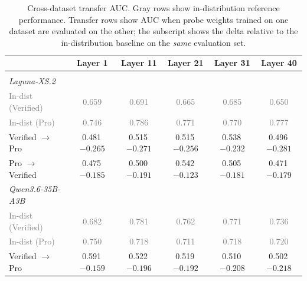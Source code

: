 \begin{table}[t]
\centering
\caption{Cross-dataset transfer AUC. Gray rows show in-distribution reference performance. Transfer rows show AUC when probe weights trained on one dataset are evaluated on the other; the subscript shows the delta relative to the in-distribution baseline on the \emph{same} evaluation set.}
\label{tab:transfer}
\begin{tabular}{lccccc}
\toprule
 & Layer 1 & Layer 11 & Layer 21 & Layer 31 & Layer 40 \\
\midrule
\multicolumn{6}{l}{\textit{\Syntactic{}}} \\
\quad{}\textit{Laguna-XS.2} \\
\qquad{}\textcolor{gray}{\small In-dist (Verified)} & \textcolor{gray}{\small 0.659} & \textcolor{gray}{\small 0.691} & \textcolor{gray}{\small 0.665} & \textcolor{gray}{\small 0.685} & \textcolor{gray}{\small 0.650} \\
\qquad{}\textcolor{gray}{\small In-dist (Pro)} & \textcolor{gray}{\small 0.746} & \textcolor{gray}{\small 0.786} & \textcolor{gray}{\small 0.771} & \textcolor{gray}{\small 0.770} & \textcolor{gray}{\small 0.777} \\
\qquad{}Verified $\rightarrow$ Pro & 0.481\,{\scriptsize \textcolor{red!70!black}{$-0.265$}} & 0.515\,{\scriptsize \textcolor{red!70!black}{$-0.271$}} & 0.515\,{\scriptsize \textcolor{red!70!black}{$-0.256$}} & 0.538\,{\scriptsize \textcolor{red!70!black}{$-0.232$}} & 0.496\,{\scriptsize \textcolor{red!70!black}{$-0.281$}}  \\
\qquad{}Pro $\rightarrow$ Verified & 0.475\,{\scriptsize \textcolor{red!70!black}{$-0.185$}} & 0.500\,{\scriptsize \textcolor{red!70!black}{$-0.191$}} & 0.542\,{\scriptsize \textcolor{red!70!black}{$-0.123$}} & 0.505\,{\scriptsize \textcolor{red!70!black}{$-0.181$}} & 0.471\,{\scriptsize \textcolor{red!70!black}{$-0.179$}}  \\
\quad{}\textit{Qwen3.6-35B-A3B} \\
\qquad{}\textcolor{gray}{\small In-dist (Verified)} & \textcolor{gray}{\small 0.682} & \textcolor{gray}{\small 0.781} & \textcolor{gray}{\small 0.762} & \textcolor{gray}{\small 0.771} & \textcolor{gray}{\small 0.736} \\
\qquad{}\textcolor{gray}{\small In-dist (Pro)} & \textcolor{gray}{\small 0.750} & \textcolor{gray}{\small 0.718} & \textcolor{gray}{\small 0.711} & \textcolor{gray}{\small 0.718} & \textcolor{gray}{\small 0.720} \\
\qquad{}Verified $\rightarrow$ Pro & 0.591\,{\scriptsize \textcolor{red!70!black}{$-0.159$}} & 0.522\,{\scriptsize \textcolor{red!70!black}{$-0.196$}} & 0.519\,{\scriptsize \textcolor{red!70!black}{$-0.192$}} & 0.510\,{\scriptsize \textcolor{red!70!black}{$-0.208$}} & 0.502\,{\scriptsize \textcolor{red!70!black}{$-0.218$}}  \\

\end{tabular}
\end{table}
